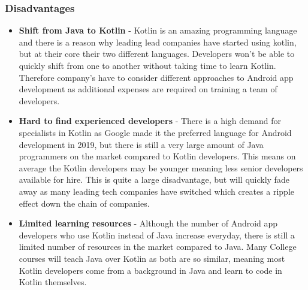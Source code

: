 \newpage

\subsubsection{Disadvantages}

\begin{itemize}
    \item \textbf{Shift from Java to Kotlin} - Kotlin is an amazing programming language and there is a reason why leading lead companies have started using kotlin, but at their core their two different languages. Developers won't be able to quickly shift from one to another without taking time to learn Kotlin. Therefore company's have to consider different approaches to Android app development as additional expenses are required on training a team of developers. 
    \item \textbf{Hard to find experienced developers} - There is a high demand for specialists in Kotlin as Google made it the preferred language for Android development in 2019, but there is still a very large amount of Java programmers on the market compared to Kotlin developers. This means on average the Kotlin developers may be younger meaning less senior developers available for hire. This is quite a large disadvantage, but will quickly fade away as many leading tech companies have switched which creates a ripple effect down the chain of companies.
    \item \textbf{Limited learning resources} - Although the number of Android app developers who use Kotlin instead of Java increase everyday, there is still a limited number of resources in the market compared to Java. Many College courses will teach Java over Kotlin as both are so similar, meaning most Kotlin developers come from a background in Java and learn to code in Kotlin themselves.
\end{itemize}



